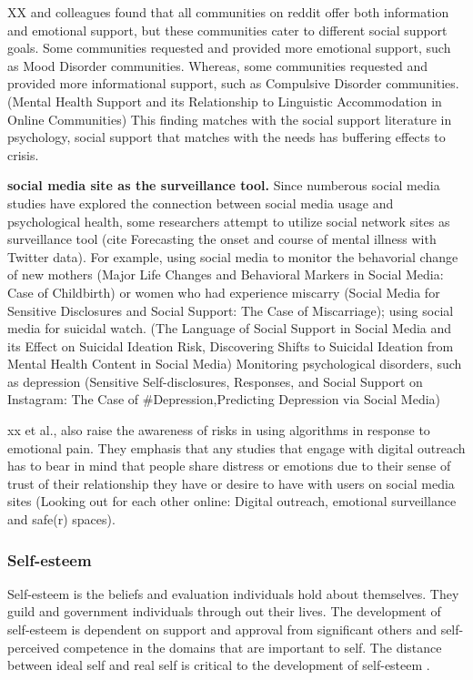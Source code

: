 XX and colleagues found that all communities on reddit offer both information and emotional support, but these communities cater to different social support goals. Some communities requested and provided more emotional support, such as Mood Disorder communities. Whereas, some communities requested and provided more informational support, such as Compulsive Disorder communities. (Mental Health Support and its Relationship to Linguistic Accommodation in Online Communities) This finding matches with the social support literature in psychology, social support that matches with the needs has buffering effects to crisis.

\textbf{social media site as the surveillance tool.} Since numberous social media studies have explored the connection between social media usage and psychological health, some researchers attempt to utilize social network sites as surveillance tool (cite Forecasting the onset and course of mental illness with Twitter data). For example, using social media to monitor the behavorial change of new mothers (Major Life Changes and Behavioral Markers in Social
Media: Case of Childbirth) or women who had experience miscarry (Social Media for Sensitive Disclosures and Social Support: The Case of Miscarriage); using social media for suicidal watch. (The Language of Social Support in Social Media and its Effect on Suicidal Ideation Risk, Discovering Shifts to Suicidal Ideation from Mental Health Content in Social Media) Monitoring psychological disorders, such as depression (Sensitive Self-disclosures, Responses, and Social Support on Instagram: The Case of #Depression,{Predicting Depression via Social Media})

xx et al., also raise the awareness of risks in using algorithms in response to emotional pain. They emphasis that any studies that engage with digital outreach has to bear in mind that people share distress or emotions due to their sense of trust of their relationship they have or desire to have with users on social media sites (Looking out for each other online: Digital outreach, emotional surveillance and safe(r) spaces).

\subsubsection{Self-esteem}
Self-esteem is the beliefs and evaluation individuals hold about themselves. They guild and government individuals through out their lives. The development of self-esteem is dependent on support and approval from significant others and self-perceived competence in the domains that are important to self. The distance between ideal self and real self is critical to the development of self-esteem \cite{burns1982self}. 

